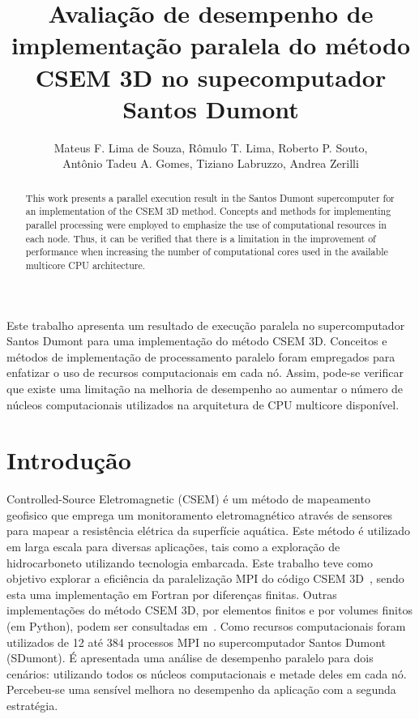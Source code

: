 \documentclass[12pt]{article}
\title{Avaliação de desempenho de implementação paralela do método CSEM 3D no supecomputador Santos Dumont}
\author{Mateus F. Lima de Souza\inst{1,2}, Rômulo T. Lima\inst{1,3}, Roberto P. Souto\inst{1}, \\ 
        Antônio Tadeu A. Gomes\inst{1}, Tiziano Labruzzo\inst{1,4}, Andrea Zerilli\inst{1,4}}
\begin{document}
 

\maketitle

\begin{abstract}
This work presents a parallel execution result in the Santos Dumont supercomputer for an implementation of the CSEM 3D method. Concepts and methods for implementing parallel processing were employed to emphasize the use of computational resources in each node. Thus, it can be verified that there is a limitation in the improvement of performance when increasing the number of computational cores used in the available multicore CPU architecture.
\end{abstract}
     
\begin{resumo} 
Este trabalho apresenta um resultado de execução paralela no supercomputador Santos Dumont para uma implementação do método CSEM 3D. Conceitos e métodos de implementação de processamento paralelo foram empregados para enfatizar o uso de recursos computacionais em cada nó. Assim, pode-se verificar que existe uma limitação na melhoria de desempenho ao aumentar o número de núcleos computacionais utilizados na arquitetura de CPU multicore disponível.
\end{resumo}

\section{Introdução}
Controlled-Source Eletromagnetic (CSEM) é um método de mapeamento geofisico que emprega um monitoramento eletromagnético através de sensores para mapear a resistência elétrica da superfície aquática. Este método é utilizado em larga escala para diversas aplicações, tais como a exploração de hidrocarboneto utilizando tecnologia embarcada. Este trabalho teve como objetivo explorar a eficiência da paralelização MPI do código CSEM 3D~\cite{zerilli2014broadband,zerilli2016broadband}, sendo esta uma implementação em Fortran por diferenças finitas. Outras implementações do método CSEM 3D, por elementos finitos e por volumes finitos (em Python), podem ser consultadas em~\cite{werthmuller_towards_2021}. Como recursos computacionais foram utilizados de 12 até 384 processos MPI no supercomputador Santos Dumont (SDumont).  É apresentada uma análise de desempenho paralelo para dois cenários: utilizando todos os núcleos computacionais e metade deles em cada nó. Percebeu-se uma sensível melhora no desempenho da aplicação com a segunda estratégia.
\end{document}
